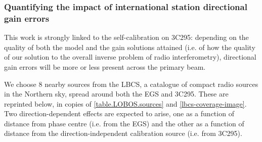 \subsubsection{Quantifying the impact of international station directional gain errors}

\pg
This work is strongly linked to the self-calibration on 3C295: depending on the quality of both the model and the gain solutions attained (i.e. of how the quality of our solution to the overall inverse problem of radio interferometry), directional gain errors will be more or less present across the primary beam.

\pg
We choose 8 nearby sources from the LBCS, a catalogue of compact radio sources in the Northern sky, spread around both the EGS and 3C295. These are reprinted below, in copies of \cref{table.LOBOS.sources} and \cref{lbcs-coverage-image}. Two direction-dependent effects are expected to arise, one as a function of distance from phase centre (i.e. from the EGS) and the other as a function of distance from the direction-independent calibration source (i.e. from 3C295). %


